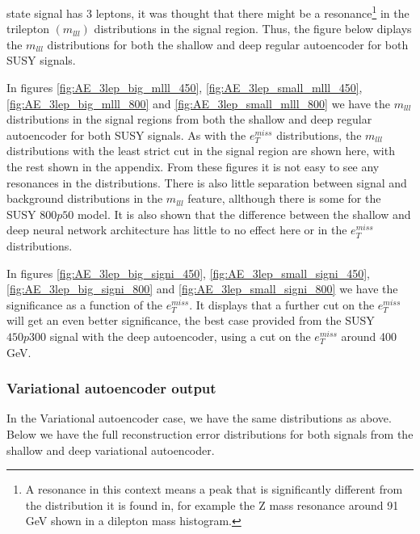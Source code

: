 state signal has 3 leptons, it was thought that there might be a resonance\footnote{A resonance 
in this context means a peak that is significantly different from the distribution it is found 
in, for example the Z mass resonance around 91 GeV shown in a dilepton mass histogram. } in 
the trilepton $(m_{lll})$ distributions in the signal region. Thus, the figure below diplays 
the $m_{lll}$ distributions for both the shallow and deep regular autoencoder for both SUSY signals. \par
In figures \ref{fig:AE_3lep_big_mlll_450}, \ref{fig:AE_3lep_small_mlll_450}, \ref{fig:AE_3lep_big_mlll_800} and  
\ref{fig:AE_3lep_small_mlll_800} we have the  $m_{lll}$ distributions in the signal 
regions from both the shallow and deep regular 
autoencoder for both SUSY signals. As with the $e_T^{miss}$ distributions, the $m_{lll}$ distributions 
with the least strict cut in the signal region 
are shown here, with the rest shown in the appendix. From these figures it is not easy to see any resonances 
in the distributions. There is also little separation between signal and background distributions in 
the $m_{lll}$ feature, allthough there is some for the SUSY $800p50$ model. It is also 
shown that the difference between the shallow and deep neural network architecture has little to no effect 
here or in the $e_T^{miss}$ distributions.   \par 
In figures \ref{fig:AE_3lep_big_signi_450}, \ref{fig:AE_3lep_small_signi_450}, \ref{fig:AE_3lep_big_signi_800} and  
\ref{fig:AE_3lep_small_signi_800} we have the significance as a function of the $e_T^{miss}$. It displays that 
a further cut on the $e_T^{miss}$ will get an even better significance, the best case provided from the SUSY $450p300$
signal with the deep autoencoder, using a cut on the $e_T^{miss}$ around 400 GeV. 


\subsubsection*{Variational autoencoder output}
In the Variational autoencoder case, we have the same distributions as above. Below we have the full reconstruction 
error distributions for both signals from the shallow and deep variational autoencoder. 



